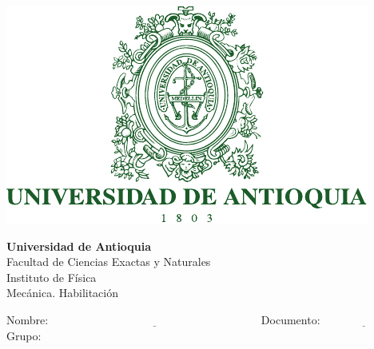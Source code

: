 \documentclass[12pt]{article}
\newcommand{\tipoexamen}{Habilitaci\'on}
\begin{document}
\pagestyle{empty}
\sffamily

\begin{minipage}{6 cm}{\begin{center}
\includegraphics[scale=0.7]{udea}\end{center}}\end{minipage}
\begin{minipage}{12 cm}{
\begin{flushright}\vspace*{0.2cm}\Large\textbf{Universidad de Antioquia}\\
Facultad de Ciencias Exactas y Naturales\\
Instituto de Física\\
Mecánica. \tipoexamen{}\\

\end{flushright}
}
\end{minipage}

\vspace{0.4 cm}
Nombre:$\underline{\hspace{8cm}}$Documento: $\underline{\hspace{3cm}}$\quad Grupo: \hrulefill
\end{document}
